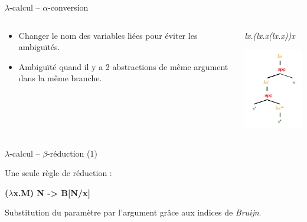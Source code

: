 \documentclass{beamer}
\begin{document}
\begin{frame}{$\lambda$-calcul -- $\alpha$-conversion}

  \begin{columns}
    \begin{column}{5cm}
      \begin{itemize}
      \item Changer le nom des variables liées pour éviter les ambiguïtés.
      \item Ambiguïté quand il y a 2 abstractions de même argument dans la même branche.
      \end{itemize}
    \end{column}

    \begin{column}{5cm}
      \begin{center}
        \textit{lx.(lx.x(lx.x))x}

        \includegraphics{lambda3.png}
      \end{center}
    \end{column}
  \end{columns}

\end{frame}

\begin{frame}{$\lambda$-calcul -- $\beta$-réduction (1)}

  Une seule règle de réduction :

  \medskip

  \textbf{($\lambda$x.M) N  -> B[N/x]}

  \medskip

  Substitution du paramètre par l'argument grâce aux indices de \textit{Bruijn}.

\end{frame}
\end{document}
